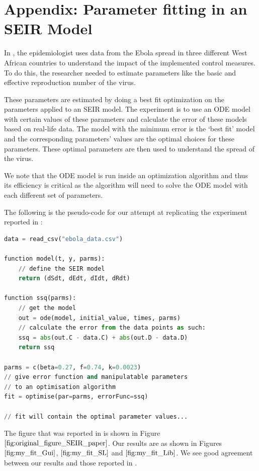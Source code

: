 \section{Appendix: Parameter fitting in an SEIR Model}
\label{section:ebola_paper}
In \cite{althaus2014estimating}, the epidemiologist uses data from the Ebola spread in three different West African countries to understand the impact of the implemented control measures. To do this, the researcher needed to estimate parameters like the basic and effective reproduction number of the virus.

These parameters are estimated by doing a best fit optimization on the parameters applied to an SEIR model. The experiment is to use an ODE model with certain values of these parameters and calculate the error of these models based on real-life data. The model with the minimum error is the `best fit' model and the corresponding parameters' values are the optimal choices for these parameters. These optimal parameters are then used to understand the spread of the virus. 

We note that the ODE model is run inside an optimization algorithm and thus its efficiency is critical as the algorithm will need to solve the ODE model with each different set of parameters.

The following is the pseudo-code for our attempt at replicating the experiment reported in \cite{althaus2014estimating}:

\begin{minipage}{\linewidth}
\begin{lstlisting}[language=Python]
data = read_csv("ebola_data.csv")

function model(t, y, parms):
    // define the SEIR model
    return (dSdt, dEdt, dIdt, dRdt)

function ssq(parms):
    // get the model
    out = ode(model, initial_value, times, parms)
    // calculate the error from the data points as such:
    ssq = abs(out.C - data.C) + abs(out.D - data.D)
    return ssq

parms = c(beta=0.27, f=0.74, k=0.0023)
// give error function and manipulatable parameters
// to an optimisation algorithm
fit = optimise(par=parms, errorFunc=ssq)

// fit will contain the optimal parameter values...
\end{lstlisting}
\end{minipage}

The figure that was reported in  \cite{althaus2014estimating} is shown in Figure $\ref{fig:original_figure_SEIR_paper}$. Our results are as shown in Figures $\ref{fig:my_fit_Gui}$, $\ref{fig:my_fit_SL}$ and $\ref{fig:my_fit_Lib}$. We see good agreement between our results and those reported in  \cite{althaus2014estimating}.

